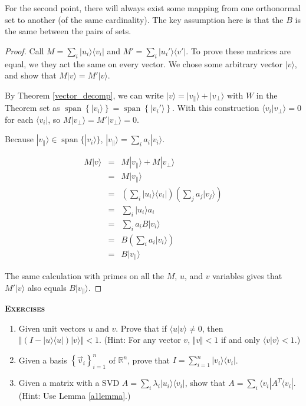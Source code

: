 \documentclass{amsbook}
\begin{document}
For the second point, there will always exist some mapping from one orthonormal set to another (of the same cardinality).  The key assumption here is that the $B$ is the same between the pairs of sets.

\begin{proof}
Call $M=\sum_i|u_i\rangle\langle v_i|$ and $M'=\sum_i|u_i'\rangle\langle v'|$.  To prove these matrices are equal, we they act the same on every vector.  We chose some arbitrary vector $|v\rangle$, and show that $M|v\rangle=M'|v\rangle$.

By Theorem \ref{vector_decomp}, we can write $|v\rangle=|v_\parallel\rangle+|v_\bot\rangle$ with $W$ in the Theorem set as $\operatorname{span}\left\{|v_i\rangle\right\}=\operatorname{span}\left\{|v_i'\rangle\right\}$.  With this construction $\langle v_i|v_\bot\rangle=0$ for each $\langle v_i|$, so $M|v_\bot\rangle=M'|v_\bot\rangle=0$.

Because $|v_\parallel\rangle\in\operatorname{span}\{|v_i\rangle\}$, $|v_\parallel\rangle=\sum_ia_i|v_i\rangle$.

$$
\begin{array}{rcl}
M|v\rangle &=& M|v_\parallel\rangle+M|v_\bot\rangle \\
 &=& M|v_\parallel\rangle \\
 &=& \left(\sum_i|u_i\rangle\langle v_i|\right)\left(\sum_ja_j|v_j\rangle\right) \\
 &=& \sum_i|u_i\rangle a_i \\
 &=& \sum_ia_iB|v_i\rangle \\
 &=& B\left(\sum_ia_i|v_i\rangle\right) \\
 &=& B|v_\parallel\rangle
\end{array}
$$

The same calculation with primes on all the $M$, $u$, and $v$ variables gives that $M'|v\rangle$ also equals $B|v_\parallel\rangle$.  
\end{proof}

{\bfseries\scshape\Large Exercises}

\begin{enumerate}
\item \label{finish_projection} Given unit vectors $u$ and $v$.  Prove that if $\langle u|v\rangle\neq0$, then $\left\Vert\left(I-|u\rangle\langle u|\right)|v\rangle\right\Vert < 1$.  (Hint:  For any vector $ v $, $\Vert  v \Vert<1$ if and only $\langle  v | v \rangle<1$.)
\item \label{outer_product_identity} Given a basis $\left\{\vec v_i\right\}_{i=1}^n$ of $\mathbb R^n$, prove that $I=\sum_{i=1}^n|v_i\rangle\langle v_i|$.
\item Given a matrix with a SVD $A=\sum_i\lambda_i|u_i\rangle\langle v_i|$, show that $A=\sum_i\langle v_i| A^T\langle v_i|$.  (Hint: Use Lemma \ref{a1lemma}.)
\end{enumerate}
\end{document}
